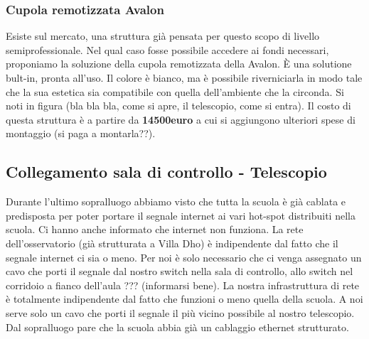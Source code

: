 \documentclass[a4paper,12pt]{article}
\begin{document}
\subsubsection{Cupola remotizzata Avalon}
Esiste sul mercato, una struttura gi\`a pensata per questo scopo di livello semiprofessionale. Nel qual caso fosse possibile accedere ai fondi necessari, proponiamo la soluzione della cupola remotizzata della Avalon. \`E una solutione bult-in, pronta all'uso. Il colore \`e bianco, ma \`e possibile riverniciarla in modo tale che la sua estetica sia compatibile con quella dell'ambiente che la circonda. Si noti in figura (bla bla bla, come si apre, il telescopio, come si entra).
Il costo di questa struttura \`e a partire da \textbf{14500euro} a cui si aggiungono ulteriori spese di montaggio (si paga a montarla??). 


















\subsection{Collegamento sala di controllo - Telescopio}
Durante l'ultimo sopralluogo abbiamo visto che tutta la scuola \`e gi\`a cablata e predisposta per poter portare il segnale internet ai vari hot-spot distribuiti nella scuola. Ci hanno anche informato che internet non funziona. La rete dell'osservatorio (gi\`a strutturata a Villa Dho) \`e indipendente dal fatto che il segnale  internet ci sia o meno. Per noi \`e solo necessario che ci venga assegnato un cavo che porti il segnale dal nostro switch nella sala di controllo, allo switch nel corridoio a fianco dell'aula ??? (informarsi bene). La nostra infrastruttura di rete \`e totalmente indipendente dal fatto che funzioni o meno quella della scuola. A noi serve solo un cavo che porti il segnale il pi\`u vicino possibile al nostro telescopio. Dal sopralluogo pare che la scuola abbia gi\`a un cablaggio ethernet strutturato.
\end{document}
